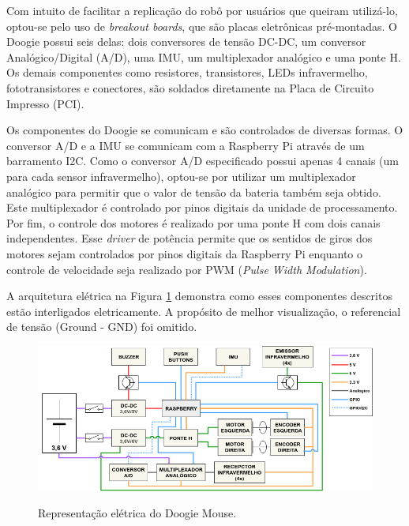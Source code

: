 Com intuito de facilitar a replicação do robô por usuários que queiram utilizá-lo, optou-se pelo uso de \textit{breakout boards}, que são placas eletrônicas pré-montadas. O Doogie possui seis delas: dois conversores de tensão DC-DC, um conversor Analógico/Digital (A/D), uma IMU, um multiplexador analógico e uma ponte H. Os demais componentes como resistores, transistores, LEDs infravermelho, fototransistores e conectores, são soldados diretamente na Placa de Circuito Impresso (PCI).

Os componentes do Doogie se comunicam e são controlados de diversas formas. O conversor A/D e a IMU se comunicam com a Raspberry Pi através de um barramento I2C. Como o conversor A/D especificado possui apenas 4 canais (um para cada sensor infravermelho), optou-se por utilizar um multiplexador analógico para permitir que o valor de tensão da bateria também seja obtido. Este multiplexador é controlado por pinos digitais da unidade de processamento. Por fim, o controle dos motores é realizado por uma ponte H com dois canais independentes. Esse \textit{driver} de potência permite que os sentidos de giros dos motores sejam controlados por pinos digitais da Raspberry Pi enquanto o controle de velocidade seja realizado por PWM (\textit{Pulse Width Modulation}).

A arquitetura elétrica na Figura \ref{fig:arquitetura_eletrica} demonstra como esses componentes descritos estão interligados eletricamente. A propósito de melhor visualização, o referencial de tensão (Ground - GND) foi omitido.

\begin{figure}[H]
	\centering
	\caption{Representação elétrica do Doogie Mouse.}
	\includegraphics[width=1\textwidth]
	{Figures/arquitetura_eletrica}
	\label{fig:arquitetura_eletrica}
\end{figure}

